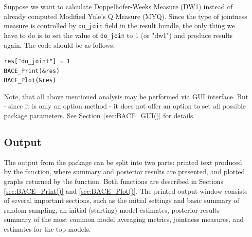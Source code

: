 Suppose we want to calculate Doppelhofer-Weeks Measure (DW1)
instead of already computed Modified Yule's Q Measure (MYQ).
Since the type of jointness measure is controlled by
\lstinline!do_join! field in the result bundle, the only
thing we have to do is to set the value of \lstinline!do_join!
to 1 (or "dw1") and produce  results again.
The code should be as follows:
\begin{lstlisting}
res["do_joint"] = 1
BACE_Print(&res)
BACE_Plot(&res)
\end{lstlisting}

Note, that all above mentioned analysis may
be performed via GUI interface. But - since
it is only an option method - it does not offer
an option to set all possible package parameters.
See Section~\ref{sec:BACE_GUI()} for details.


\subsection{Output}\label{sec:outputs}
The output from the  package can be split into
two parts: printed text produced by the 
function, where summary and posterior results are presented,
and plotted graphs returned by the  function.
Both functions are described in Sections \ref{sec:BACE_Print()}
and \ref{sec:BACE_Plot()}. The printed output window consists of
several important sections, such as the initial settings and
basic summary of random sampling, an initial (starting) model
estimates, posterior results—summary of the most common model
averaging metrics, jointness measures, and estimates for the top models.

